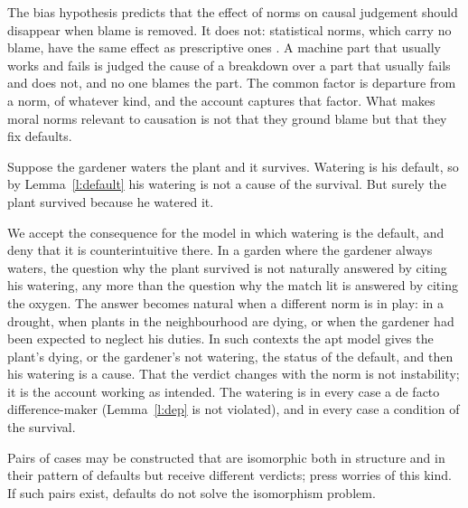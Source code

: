 \documentclass{situationist-preprint}
\begin{document}
\begin{reply}
The bias hypothesis predicts that the effect of norms on causal judgement should disappear when blame is removed. It does not: statistical norms, which carry no blame, have the same effect as prescriptive ones \citep{HitchcockKnobe2009,Icard2017}. A machine part that usually works and fails is judged the cause of a breakdown over a part that usually fails and does not, and no one blames the part. The common factor is departure from a norm, of whatever kind, and the account captures that factor. What makes moral norms relevant to causation is not that they ground blame but that they fix defaults.
\end{reply}

\begin{objection}
Suppose the gardener waters the plant and it survives. Watering is his default, so by Lemma~\ref{l:default} his watering is not a cause of the survival. But surely the plant survived because he watered it.
\end{objection}

\begin{reply}
We accept the consequence for the model in which watering is the default, and deny that it is counterintuitive there. In a garden where the gardener always waters, the question why the plant survived is not naturally answered by citing his watering, any more than the question why the match lit is answered by citing the oxygen. The answer becomes natural when a different norm is in play: in a drought, when plants in the neighbourhood are dying, or when the gardener had been expected to neglect his duties. In such contexts the apt model gives the plant's dying, or the gardener's not watering, the status of the default, and then his watering is a cause. That the verdict changes with the norm is not instability; it is the account working as intended. The watering is in every case a de facto difference-maker (Lemma~\ref{l:dep} is not violated), and in every case a condition of the survival.
\end{reply}

\begin{objection}
Pairs of cases may be constructed that are isomorphic both in structure and in their pattern of defaults but receive different verdicts; \citet{BlanchardSchaffer2017} press worries of this kind. If such pairs exist, defaults do not solve the isomorphism problem.
\end{objection}
\end{document}
